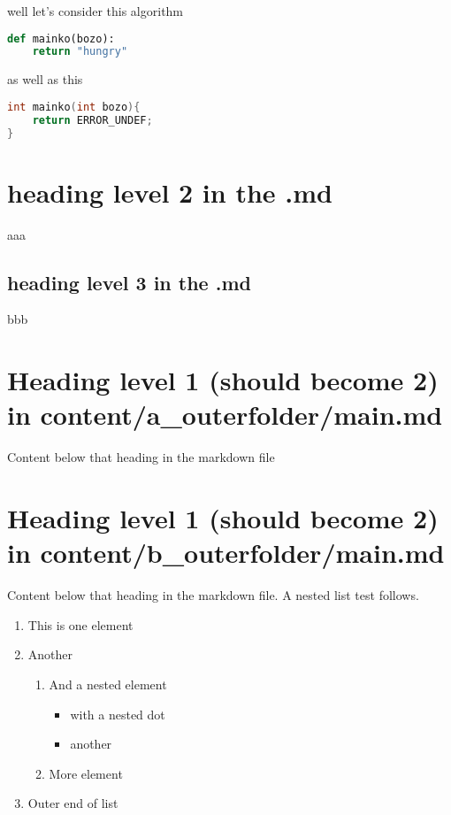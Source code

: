 \documentclass{paper}
\def\tightlist{} %
\begin{document}
well let's consider this algorithm

\begin{lstlisting}[language=Python]
def mainko(bozo):
    return "hungry"
\end{lstlisting}

as well as this

\begin{lstlisting}[language=C]
int mainko(int bozo){
    return ERROR_UNDEF;
}
\end{lstlisting}

\hypertarget{heading-level-2-in-the-.md}{%
\section{heading level 2 in the .md}\label{heading-level-2-in-the-.md}}

aaa

\hypertarget{heading-level-3-in-the-.md}{%
\subsection{heading level 3 in the
.md}\label{heading-level-3-in-the-.md}}

bbb

\hypertarget{heading-level-1-should-become-2-in-contenta_outerfoldermain.md}{%
\section{Heading level 1 (should become 2) in
content/a\_outerfolder/main.md}\label{heading-level-1-should-become-2-in-contenta_outerfoldermain.md}}

Content below that heading in the markdown file

\hypertarget{heading-level-1-should-become-2-in-contentb_outerfoldermain.md}{%
\section{Heading level 1 (should become 2) in
content/b\_outerfolder/main.md}\label{heading-level-1-should-become-2-in-contentb_outerfoldermain.md}}

Content below that heading in the markdown file. A nested list test
follows.

\begin{enumerate}
\def\labelenumi{\arabic{enumi}.}
\tightlist
\item
  This is one element
\item
  Another

  \begin{enumerate}
  \def\labelenumii{\arabic{enumii}.}
  \tightlist
  \item
    And a nested element

    \begin{itemize}
    \tightlist
    \item
      with a nested dot
    \item
      another
    \end{itemize}
  \item
    More element
  \end{enumerate}
\item
  Outer end of list
\end{enumerate}
\end{document}
